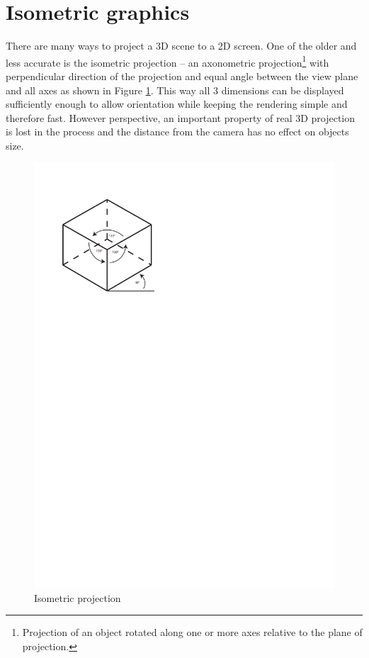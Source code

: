 \documentclass[11pt,oneside, final]{fithesis2}
\begin{document}
\section{Isometric graphics}
There are many ways to project a 3D scene to a 2D screen. One of the older and less accurate is the isometric projection -- an axonometric projection\footnote{Projection of an object rotated along one or more axes relative to the plane of projection\cite{maynard}.} with perpendicular direction of the projection and equal angle between the view plane and all axes\cite{desai} as shown in Figure \ref{isometric}. This way all 3 dimensions can be displayed sufficiently enough to allow orientation while keeping the rendering simple and therefore fast. However perspective, an important property of real 3D projection is lost in the process and the distance from the camera has no effect on objects size.

\begin{figure}[h]
	\centering
	\includegraphics[clip=true,trim=0 205mm 100mm 20mm]{thesis-isobox}
	\caption{Isometric projection}
	\label{isometric}
\end{figure}
\end{document}
